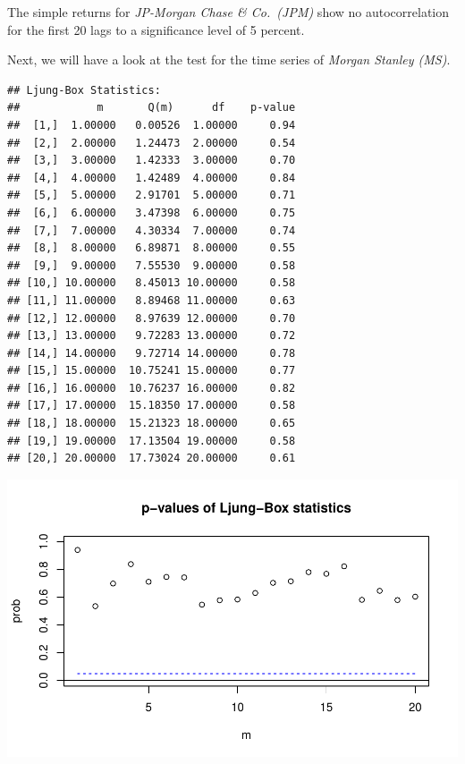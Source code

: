\documentclass[12pt,a4paper]{article}
\newenvironment{Shaded}{\begin{snugshade}}{\end{snugshade}}
\newcommand{\DataTypeTok}[1]{\textcolor[rgb]{0.13,0.29,0.53}{#1}}
\newcommand{\DecValTok}[1]{\textcolor[rgb]{0.00,0.00,0.81}{#1}}
\newcommand{\KeywordTok}[1]{\textcolor[rgb]{0.13,0.29,0.53}{\textbf{#1}}}
\newcommand{\NormalTok}[1]{#1}
\newcommand{\OperatorTok}[1]{\textcolor[rgb]{0.81,0.36,0.00}{\textbf{#1}}}
\begin{document}
\FloatBarrier

The simple returns for \emph{JP-Morgan Chase \& Co.~(JPM)} show no
autocorrelation for the first 20 lags to a significance level of 5
percent.

Next, we will have a look at the test for the time series of
\emph{Morgan Stanley (MS)}. \FloatBarrier

\begin{Shaded}
\end{Shaded}

\begin{verbatim}
## Ljung-Box Statistics:  
##            m       Q(m)      df    p-value
##  [1,]  1.00000   0.00526  1.00000     0.94
##  [2,]  2.00000   1.24473  2.00000     0.54
##  [3,]  3.00000   1.42333  3.00000     0.70
##  [4,]  4.00000   1.42489  4.00000     0.84
##  [5,]  5.00000   2.91701  5.00000     0.71
##  [6,]  6.00000   3.47398  6.00000     0.75
##  [7,]  7.00000   4.30334  7.00000     0.74
##  [8,]  8.00000   6.89871  8.00000     0.55
##  [9,]  9.00000   7.55530  9.00000     0.58
## [10,] 10.00000   8.45013 10.00000     0.58
## [11,] 11.00000   8.89468 11.00000     0.63
## [12,] 12.00000   8.97639 12.00000     0.70
## [13,] 13.00000   9.72283 13.00000     0.72
## [14,] 14.00000   9.72714 14.00000     0.78
## [15,] 15.00000  10.75241 15.00000     0.77
## [16,] 16.00000  10.76237 16.00000     0.82
## [17,] 17.00000  15.18350 17.00000     0.58
## [18,] 18.00000  15.21323 18.00000     0.65
## [19,] 19.00000  17.13504 19.00000     0.58
## [20,] 20.00000  17.73024 20.00000     0.61
\end{verbatim}

\includegraphics{solution_exercise_1_files/figure-latex/unnamed-chunk-4-1.pdf}
\end{document}
